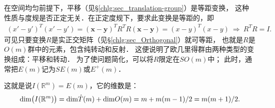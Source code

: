 在空间均匀前提下，平移（见\S\ref{chlg:sec_translation-group}）是等距变换，
这种性质与度规是否正定无关．在正定度规下，要求此变换是等距的，即
\begin{align*}
    (x'-y')^T (x'-y') = ( \boldsymbol{x} - \boldsymbol{y} )^T R^T  R ( \boldsymbol{x} - \boldsymbol{y} )
    = (x-y)^T (x-y) \ \Rightarrow\ R^T R = I .
\end{align*}
可见只要变换$R$是实正交矩阵（见\S\ref{chlg:sec_Orthogonal}）就可等距，
也就是$R$是$O(m)$群中的元素，包含纯转动和反射．
这便说明了欧几里得群由两种类型的变换组成：平移和转动．
为了使问题简化，可以将$R$限定在$SO(m)$中；
此时，通常把$E(m)$记为$SE(m)$或$E^+ (m)$．

这就是说$I(\mathbb{R}^m)=E(m)$，它的维数是：
\begin{equation*}
    {\rm dim}\bigl(I(\mathbb{R}^m)\bigr)= {\rm dim}  \hat{T}(m) + {\rm dim} O(m)
    = m + m(m-1)/2 = m(m+1)/2 .
\end{equation*}



